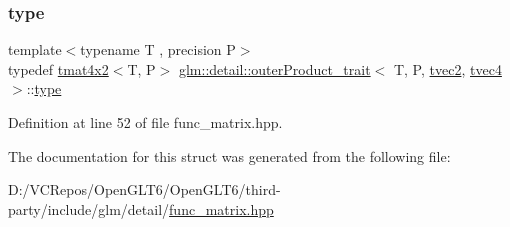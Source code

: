 \subsubsection{\texorpdfstring{type}{type}}
{\footnotesize\ttfamily template$<$typename T , precision P$>$ \\
typedef \mbox{\hyperlink{structglm_1_1tmat4x2}{tmat4x2}}$<$T, P$>$ \mbox{\hyperlink{structglm_1_1detail_1_1outer_product__trait}{glm\+::detail\+::outer\+Product\+\_\+trait}}$<$ T, P, \mbox{\hyperlink{structglm_1_1tvec2}{tvec2}}, \mbox{\hyperlink{structglm_1_1tvec4}{tvec4}} $>$\+::\mbox{\hyperlink{structglm_1_1detail_1_1outer_product__trait_3_01_t_00_01_p_00_01tvec2_00_01tvec4_01_4_a09deeaa6aef1fc2c29aa2e0650ba750b}{type}}}



Definition at line 52 of file func\+\_\+matrix.\+hpp.



The documentation for this struct was generated from the following file\+:\begin{DoxyCompactItemize}
\item 
D\+:/\+V\+C\+Repos/\+Open\+G\+L\+T6/\+Open\+G\+L\+T6/third-\/party/include/glm/detail/\mbox{\hyperlink{func__matrix_8hpp}{func\+\_\+matrix.\+hpp}}\end{DoxyCompactItemize}
